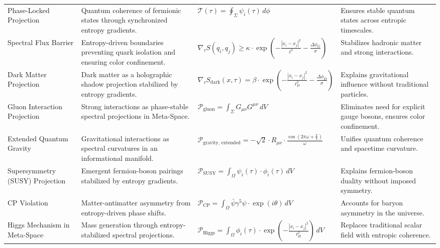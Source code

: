 \documentclass[10.5pt,a4paper]{article}
\begin{document}
{\begin{longtable}{p{2.5cm} p{4.75cm} p{5cm} p{4.25cm}}
Phase-Locked Projection & Quantum coherence of fermionic states through synchronized entropy gradients. & \( \mathcal{T}(\tau) = \oint_\Sigma \psi_i(\tau) \, d\phi \) & Ensures stable quantum states across entropic timescales. \\

Spectral Flux Barrier & Entropy-driven boundaries preventing quark isolation and ensuring color confinement. & \( \nabla_\tau S(q_i, q_j) \geq \kappa \cdot \exp\left(-\frac{|x_i - x_j|^2}{\ell^2} - \frac{\Delta \phi_G}{\sigma}\right) \) & Stabilizes hadronic matter and strong interactions. \\

Dark Matter Projection & Dark matter as a holographic shadow projection stabilized by entropy gradients. & \( \nabla_\tau S_{\text{dark}}(x, \tau) = \beta \cdot \exp\left(-\frac{|x_i - x_j|^2}{\ell_D^2} - \frac{\Delta \phi_D}{\sigma}\right) \) & Explains gravitational influence without traditional particles. \\

Gluon Interaction Projection & Strong interactions as phase-stable spectral projections in Meta-Space. & \( \mathcal{P}_{\text{gluon}} = \int_\Sigma G_{\mu\nu} G^{\mu\nu} \, dV \) & Eliminates need for explicit gauge bosons, ensures color confinement. \\

Extended Quantum Gravity & Gravitational interactions as spectral curvatures in an informational manifold. & \( \mathcal{P}_{\text{gravity, extended}} = -\sqrt{2} \cdot R_{\mu\nu} \cdot \frac{\cos(2\pi \omega + \frac{\pi}{4})}{\omega} \) & Unifies quantum coherence and spacetime curvature. \\

Supersymmetry (SUSY) Projection & Emergent fermion-boson pairings stabilized by entropy gradients. & \( \mathcal{P}_{\text{SUSY}} = \int_\Omega \psi_i(\tau) \cdot \phi_i(\tau) \, dV \) & Explains fermion-boson duality without imposed symmetry. \\

CP Violation & Matter-antimatter asymmetry from entropy-driven phase shifts. & \( \mathcal{P}_{\text{CP}} = \int_\Omega \bar{\psi} \gamma^5 \psi \cdot \exp(i\theta) \, dV \) & Accounts for baryon asymmetry in the universe. \\

Higgs Mechanism in Meta-Space & Mass generation through entropy-stabilized spectral projections. & \( \mathcal{P}_{\text{Higgs}} = \int_\Omega \phi_i(\tau) \cdot \exp\left(-\frac{|x_i - x_j|^2}{\ell_H^2}\right) \, dV \) & Replaces traditional scalar field with entropic coherence. \\


\end{longtable}}
\end{document}
